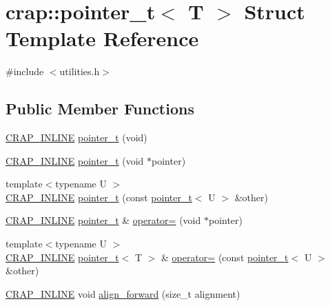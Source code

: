 \hypertarget{structcrap_1_1pointer__t}{\section{crap\+:\+:pointer\+\_\+t$<$ T $>$ Struct Template Reference}
\label{structcrap_1_1pointer__t}
}


{\ttfamily \#include $<$utilities.\+h$>$}

\subsection*{Public Member Functions}
\begin{DoxyCompactItemize}
\item 
\hyperlink{config__x86_8h_a5a40526b8d842e7ff731509998bb0f1c}{C\+R\+A\+P\+\_\+\+I\+N\+L\+I\+N\+E} \hyperlink{structcrap_1_1pointer__t_a54b2fe8de0db51614313653ee94d4cda}{pointer\+\_\+t} (void)
\item 
\hyperlink{config__x86_8h_a5a40526b8d842e7ff731509998bb0f1c}{C\+R\+A\+P\+\_\+\+I\+N\+L\+I\+N\+E} \hyperlink{structcrap_1_1pointer__t_a326b4ba6bb74cade18c5c3fcc6dd6282}{pointer\+\_\+t} (void $\ast$pointer)
\item 
{\footnotesize template$<$typename U $>$ }\\\hyperlink{config__x86_8h_a5a40526b8d842e7ff731509998bb0f1c}{C\+R\+A\+P\+\_\+\+I\+N\+L\+I\+N\+E} \hyperlink{structcrap_1_1pointer__t_a0d9194463b8acd76734350740b14136a}{pointer\+\_\+t} (const \hyperlink{structcrap_1_1pointer__t}{pointer\+\_\+t}$<$ U $>$ \&other)
\item 
\hyperlink{config__x86_8h_a5a40526b8d842e7ff731509998bb0f1c}{C\+R\+A\+P\+\_\+\+I\+N\+L\+I\+N\+E} \hyperlink{structcrap_1_1pointer__t}{pointer\+\_\+t} \& \hyperlink{structcrap_1_1pointer__t_a83371114b3e9eaf97682bf0adb5b2b9a}{operator=} (void $\ast$pointer)
\item 
{\footnotesize template$<$typename U $>$ }\\\hyperlink{config__x86_8h_a5a40526b8d842e7ff731509998bb0f1c}{C\+R\+A\+P\+\_\+\+I\+N\+L\+I\+N\+E} \hyperlink{structcrap_1_1pointer__t}{pointer\+\_\+t}$<$ T $>$ \& \hyperlink{structcrap_1_1pointer__t_ac498e6bc0d4ce16023122a308ae7acb1}{operator=} (const \hyperlink{structcrap_1_1pointer__t}{pointer\+\_\+t}$<$ U $>$ \&other)
\item 
\hyperlink{config__x86_8h_a5a40526b8d842e7ff731509998bb0f1c}{C\+R\+A\+P\+\_\+\+I\+N\+L\+I\+N\+E} void \hyperlink{structcrap_1_1pointer__t_ae1c918d1b41417dea3eff113eeb6745d}{align\+\_\+forward} (size\+\_\+t alignment)

\end{DoxyCompactItemize}
